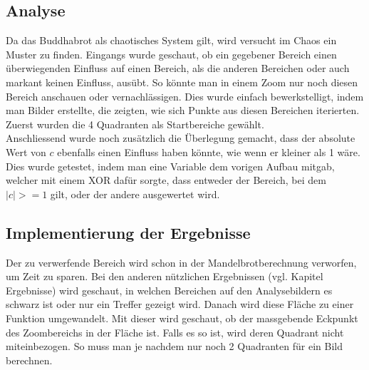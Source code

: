 \subsection{Analyse}
Da das Buddhabrot als chaotisches System gilt, wird versucht im Chaos ein Muster zu finden. Eingangs wurde geschaut, ob ein gegebener Bereich einen überwiegenden Einfluss auf einen Bereich, als die anderen Bereichen oder auch markant keinen Einfluss, ausübt. So könnte man in einem Zoom nur noch diesen Bereich anschauen oder vernachlässigen. Dies wurde einfach bewerkstelligt, indem man Bilder erstellte, die zeigten, wie sich Punkte aus diesen Bereichen iterierten. Zuerst wurden die 4 Quadranten als Startbereiche gewählt.
\\
Anschliessend wurde noch zusätzlich die Überlegung gemacht, dass der absolute Wert von $c$ ebenfalls einen Einfluss haben könnte, wie wenn er kleiner als 1 wäre. Dies wurde getestet, indem man eine Variable dem vorigen Aufbau mitgab, welcher mit einem XOR dafür sorgte, dass entweder der Bereich, bei dem $|c|>=1$ gilt, oder der andere ausgewertet wird.
\subsection{Implementierung der Ergebnisse}
Der zu verwerfende Bereich wird schon in der Mandelbrotberechnung verworfen, um Zeit zu sparen. Bei den anderen nützlichen Ergebnissen (vgl. Kapitel Ergebnisse) wird geschaut, in welchen Bereichen auf den Analysebildern es schwarz ist oder nur ein Treffer gezeigt wird. Danach wird diese Fläche zu einer Funktion umgewandelt. Mit dieser wird geschaut, ob der massgebende Eckpunkt des Zoombereichs in der Fläche ist. Falls es so ist, wird deren Quadrant nicht miteinbezogen. So muss man je nachdem nur noch 2 Quadranten für ein Bild berechnen.